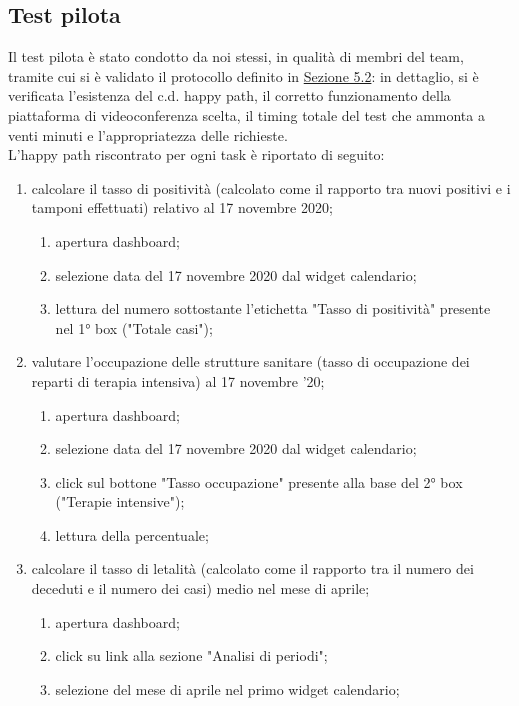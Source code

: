 \subsection{Test pilota}
\label{ss:test-pilota}
Il test pilota è stato condotto da noi stessi, in qualità di membri del team, tramite cui si è validato il protocollo definito in \hyperref[ss:selezione-preparazione-assistenti]{Sezione 5.2}: in dettaglio, si è verificata l'esistenza del c.d. happy path, il corretto funzionamento della piattaforma di videoconferenza scelta, il timing totale del test che ammonta a venti minuti e l'appropriatezza delle richieste.\\
L'happy path riscontrato per ogni task è riportato di seguito:
\begin{enumerate}
    \item calcolare il tasso di positività (calcolato come il rapporto tra nuovi positivi e i tamponi effettuati) relativo al 17 novembre 2020;
    \begin{enumerate}
        \item apertura dashboard;
        \item selezione data del 17 novembre 2020 dal widget calendario;
        \item lettura del numero sottostante l'etichetta "Tasso di positività" presente nel 1° box ("Totale casi");
    \end{enumerate}
    \item valutare l'occupazione delle strutture sanitare (tasso di occupazione dei reparti di terapia intensiva) al 17 novembre '20;
    \begin{enumerate}
        \item apertura dashboard;
        \item selezione data del 17 novembre 2020 dal widget calendario;
        \item click sul bottone "Tasso occupazione" presente alla base del 2° box ("Terapie intensive");
        \item lettura della percentuale;
    \end{enumerate}
    \item calcolare il tasso di letalità (calcolato come il rapporto tra il numero dei deceduti e il numero dei casi) medio nel mese di aprile;
    \begin{enumerate}
        \item apertura dashboard;
        \item click su link alla sezione "Analisi di periodi";
        \item selezione del mese di aprile nel primo widget calendario;

\end{enumerate}
\end{enumerate}
